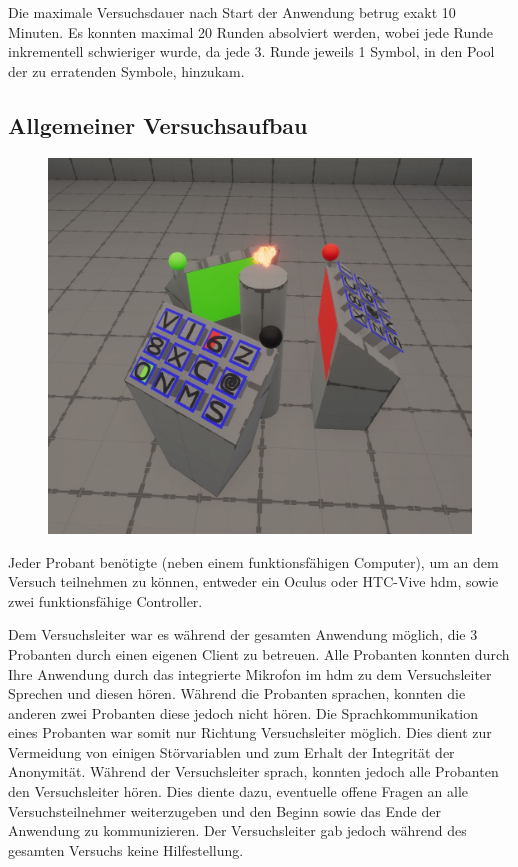\documentclass[a4paper,11pt]{article}%
\renewcommand{\\}{\vspace*{0.5\baselineskip} \newline}
\begin{document}
Die maximale Versuchsdauer nach Start der Anwendung betrug exakt 10 Minuten. Es konnten maximal 20 Runden absolviert werden, wobei jede Runde inkrementell schwieriger wurde, da jede 3. Runde jeweils 1 Symbol, in den Pool der zu erratenden Symbole, hinzukam. 


	\subsection{Allgemeiner Versuchsaufbau}

\begin{figure}[H]
		\begin{footnotesize}
			\includegraphics[width=\textwidth]{Abbildungen/Podeste.JPG}\\
			\caption[Abbildung 1]{}
			\label{Framework}
		\end{footnotesize}
	\end{figure}

Jeder Probant benötigte (neben einem funktionsfähigen Computer), um an dem Versuch teilnehmen zu können, entweder ein Oculus oder HTC-Vive \ac{hdm}, sowie zwei funktionsfähige Controller.

Dem Versuchsleiter war es während der gesamten Anwendung möglich, die 3 Probanten durch einen eigenen Client zu betreuen. Alle Probanten konnten durch Ihre Anwendung durch das integrierte Mikrofon im \ac{hdm} zu dem Versuchsleiter Sprechen und diesen hören. Während die Probanten sprachen, konnten die anderen zwei Probanten diese jedoch nicht hören. Die Sprachkommunikation eines Probanten war somit nur Richtung Versuchsleiter möglich. Dies dient zur Vermeidung von einigen Störvariablen und zum Erhalt der Integrität der Anonymität.
Während der Versuchsleiter sprach, konnten jedoch alle Probanten den Versuchsleiter hören. Dies diente dazu, eventuelle offene Fragen an alle Versuchsteilnehmer weiterzugeben und den Beginn sowie das Ende der Anwendung zu kommunizieren. Der Versuchsleiter gab jedoch während des gesamten Versuchs keine Hilfestellung.
\end{document}

